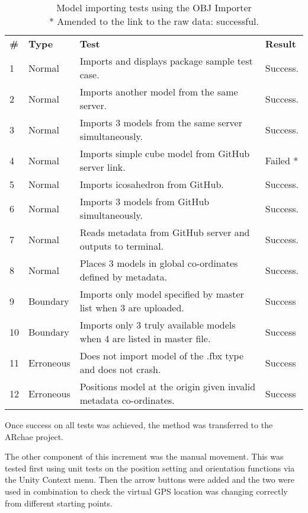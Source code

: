\documentclass[12pt, a4paper]{article}
\begin{document}
\begin{table}[H]
\footnotesize
\begin{tabular}{llll}
\textbf{\#} & \textbf{Type} & \textbf{Test}                                               & \textbf{Result} \\
1          & Normal        & Imports and displays package sample test case.              & Success.        \\
2          & Normal        & Imports another model from the same server.                 & Success.        \\
3          & Normal        & Imports 3 models from the same server simultaneously.       & Success.        \\
4  & Normal    & Imports simple cube model from GitHub server link.                      & Failed * \\
5          & Normal        & Imports icosahedron from GitHub.                            & Success.        \\
6          & Normal        & Imports 3 models from GitHub simultaneously.                & Success.        \\
7          & Normal        & Reads metadata from GitHub server and outputs to terminal.  & Success.        \\
8          & Normal        & Places 3 models in global co-ordinates defined by metadata. & Success.        \\
9          & Boundary      & Imports only model specified by master list when 3 are uploaded.   & Success         \\
10 & Boundary  & Imports only 3 truly available models when 4 are listed in master file. & Success                                                           \\
11         & Erroneous     & Does not import model of the .fbx type and does not crash.  & Success         \\
12 & Erroneous & Positions model at the origin given invalid metadata co-ordinates.      & Success 
\end{tabular}
\caption{Model importing tests using the OBJ Importer \\ * Amended to the link to the raw data: successful.}
\label{table:increment1tests}
\end{table}

Once success on all tests was achieved, the method was transferred to the ARchae project. 

The other component of this increment was the manual movement. This was tested first using unit tests on the position setting and orientation functions via the Unity Context menu. Then the arrow buttons were added and the two were used in combination to check the virtual GPS location was changing correctly from different starting points.
\end{document}
